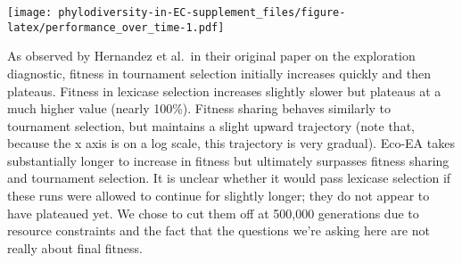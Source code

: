\documentclass[]{book}
\newenvironment{Shaded}{\begin{snugshade}}{\end{snugshade}}
\newcommand{\CommentTok}[1]{\textcolor[rgb]{0.56,0.35,0.01}{\textit{#1}}}
\newcommand{\DataTypeTok}[1]{\textcolor[rgb]{0.13,0.29,0.53}{#1}}
\newcommand{\DecValTok}[1]{\textcolor[rgb]{0.00,0.00,0.81}{#1}}
\newcommand{\FloatTok}[1]{\textcolor[rgb]{0.00,0.00,0.81}{#1}}
\newcommand{\KeywordTok}[1]{\textcolor[rgb]{0.13,0.29,0.53}{\textbf{#1}}}
\newcommand{\NormalTok}[1]{#1}
\newcommand{\OperatorTok}[1]{\textcolor[rgb]{0.81,0.36,0.00}{\textbf{#1}}}
\newcommand{\StringTok}[1]{\textcolor[rgb]{0.31,0.60,0.02}{#1}}
\begin{document}
\begin{Shaded}
\end{Shaded}

\texttt{[image: phylodiversity-in-EC-supplement\_files/figure-latex/performance\_over\_time-1.pdf]}

As observed by Hernandez et al.~in their original paper on the exploration diagnostic, fitness in tournament selection initially increases quickly and then plateaus. Fitness in lexicase selection increases slightly slower but plateaus at a much higher value (nearly 100\%). Fitness sharing behaves similarly to tournament selection, but maintains a slight upward trajectory (note that, because the x axis is on a log scale, this trajectory is very gradual). Eco-EA takes substantially longer to increase in fitness but ultimately surpasses fitness sharing and tournament selection. It is unclear whether it would pass lexicase selection if these runs were allowed to continue for slightly longer; they do not appear to have plateaued yet. We chose to cut them off at 500,000 generations due to resource constraints and the fact that the questions we're asking here are not really about final fitness.
\end{document}
